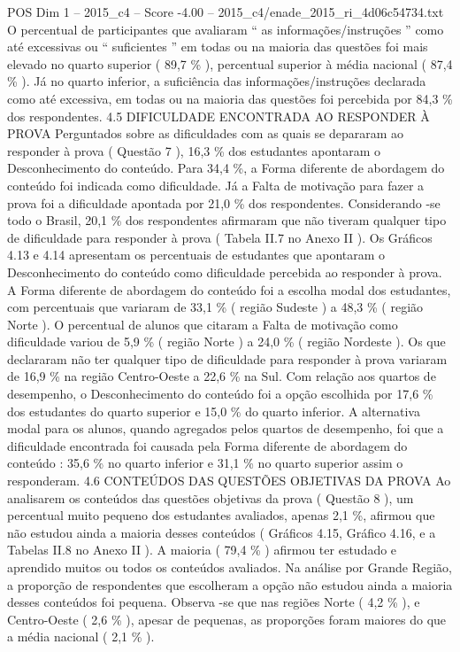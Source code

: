 \begin{textsample}{POS Dim 1 – 2015\_c4 – Score -4.00 – 2015\_c4/enade\_2015\_ri\_4d06c54734.txt}
O percentual de participantes que avaliaram “ as informações/instruções ” como até excessivas ou “ suficientes ” em todas ou na maioria das questões foi mais elevado no quarto superior ( 89,7 \% ), percentual superior à média nacional ( 87,4 \% ).
Já no quarto inferior, a suficiência das informações/instruções declarada como até excessiva, em todas ou na maioria das questões foi percebida por 84,3 \% dos respondentes. 4.5 DIFICULDADE ENCONTRADA AO RESPONDER À PROVA Perguntados sobre as dificuldades com as quais se depararam ao responder à prova ( Questão 7 ), 16,3 \% dos estudantes apontaram o Desconhecimento do conteúdo.
Para 34,4 \%, a Forma diferente de abordagem do conteúdo foi indicada como dificuldade.
Já a Falta de motivação para fazer a prova foi a dificuldade apontada por 21,0 \% dos respondentes.
Considerando -se todo o Brasil, 20,1 \% dos respondentes afirmaram que não tiveram qualquer tipo de dificuldade para responder à prova ( Tabela II.7 no Anexo II ).
Os Gráficos 4.13 e 4.14 apresentam os percentuais de estudantes que apontaram o Desconhecimento do conteúdo como dificuldade percebida ao responder à prova.
A Forma diferente de abordagem do conteúdo foi a escolha modal dos estudantes, com percentuais que variaram de 33,1 \% ( região Sudeste ) a 48,3 \% ( região Norte ).
O percentual de alunos que citaram a Falta de motivação como dificuldade variou de 5,9 \% ( região Norte ) a 24,0 \% ( região Nordeste ).
Os que declararam não ter qualquer tipo de dificuldade para responder à prova variaram de 16,9 \% na região Centro-Oeste a 22,6 \% na Sul.
Com relação aos quartos de desempenho, o Desconhecimento do conteúdo foi a opção escolhida por 17,6 \% dos estudantes do quarto superior e 15,0 \% do quarto inferior.
A alternativa modal para os alunos, quando agregados pelos quartos de desempenho, foi que a dificuldade encontrada foi causada pela Forma diferente de abordagem do conteúdo : 35,6 \% no quarto inferior e 31,1 \% no quarto superior assim o responderam. 4.6 CONTEÚDOS DAS QUESTÕES OBJETIVAS DA PROVA Ao analisarem os conteúdos das questões objetivas da prova ( Questão 8 ), um percentual muito pequeno dos estudantes avaliados, apenas 2,1 \%, afirmou que não estudou ainda a maioria desses conteúdos ( Gráficos 4.15, Gráfico 4.16, e a Tabelas II.8 no Anexo II ).
A maioria ( 79,4 \% ) afirmou ter estudado e aprendido muitos ou todos os conteúdos avaliados.
Na análise por Grande Região, a proporção de respondentes que escolheram a opção não estudou ainda a maioria desses conteúdos foi pequena.
Observa -se que nas regiões Norte ( 4,2 \% ), e Centro-Oeste ( 2,6 \% ), apesar de pequenas, as proporções foram maiores do que a média nacional ( 2,1 \% ).

\end{textsample}
